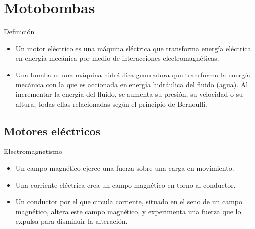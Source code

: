 \documentclass[xcolor={usenames,svgnames,dvipsnames}]{beamer}
\begin{document}
\section{Motobombas}
\label{sec-2}

\begin{frame}[label=sec-2-0-1]{Definición}
\begin{itemize}
\item Un \alert{motor eléctrico} es una máquina eléctrica que \alert{transforma energía eléctrica en energía mecánica} por medio de interacciones electromagnéticas.

\item Una \alert{bomba} es una \alert{máquina hidráulica} generadora que \alert{transforma la energía mecánica} con la que es accionada \alert{en energía hidráulica del fluido} (agua). Al incrementar la energía del fluido, se aumenta su presión, su velocidad o su altura, todas ellas relacionadas según el principio de Bernoulli.
\end{itemize}
\end{frame}

\subsection{Motores eléctricos}
\label{sec-2-1}

\begin{frame}[label=sec-2-1-1]{Electromagnetismo}
\begin{itemize}
\item Un \alert{campo magnético} ejerce una \alert{fuerza} sobre una \alert{carga en movimiento}.

\item Una \alert{corriente eléctrica crea un campo magnético} en torno al conductor.

\item Un \alert{conductor por el que circula corriente}, situado \alert{en el seno de un campo magnético}, altera este campo magnético, y \alert{experimenta una fuerza} que lo expulsa para \alert{disminuir la alteración}.
\end{itemize}
\end{frame}
\end{document}
